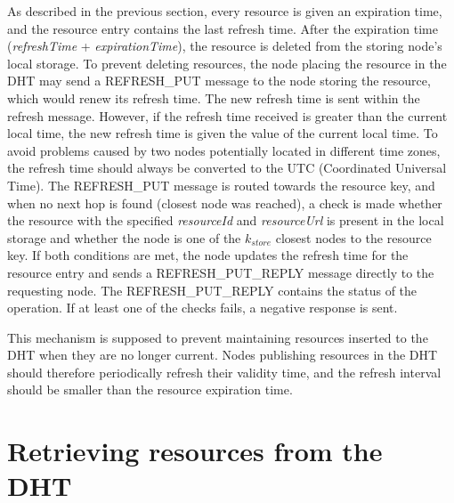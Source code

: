 As described in the previous section, every resource is given an expiration time, and the resource entry contains the last refresh time. After the expiration time (\emph{refreshTime} + \emph{expirationTime}), the resource is deleted from the storing node's local storage. To prevent deleting resources, the node placing the resource in the DHT may send a REFRESH\_PUT message to the node storing the resource, which would renew its refresh time. The new refresh time is sent within the refresh message. However, if the refresh time received is greater than the current local time, the new refresh time is given the value of the current local time. To avoid problems caused by two nodes potentially located in different time zones, the refresh time should always be converted to the UTC (Coordinated Universal Time). The REFRESH\_PUT message is routed towards the resource key, and when no next hop is found (closest node was reached), a check is made whether the resource with the specified \emph{resourceId} and \emph{resourceUrl} is present in the local storage and whether the node is one of the $k_{store}$ closest nodes to the resource key. If both conditions are met, the node updates the refresh time for the resource entry and sends a REFRESH\_PUT\_REPLY message directly to the requesting node. The REFRESH\_PUT\_REPLY contains the status of the operation. If at least one of the checks fails, a negative response is sent.

This mechanism is supposed to prevent maintaining resources inserted to the DHT when they are no longer current. Nodes publishing resources in the DHT should therefore periodically refresh their validity time, and the refresh interval should be smaller than the resource expiration time.




\section{Retrieving resources from the DHT}

